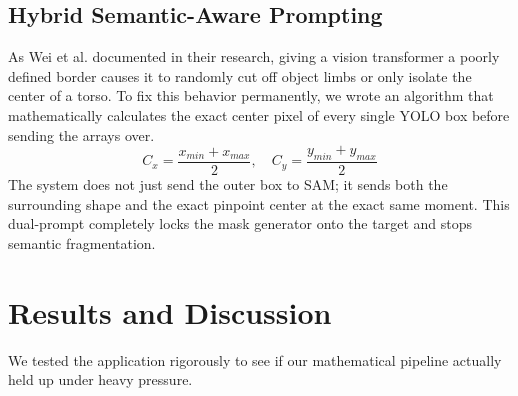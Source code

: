 \documentclass[10pt, conference]{IEEEtran}
\begin{document}
\vspace{0.3cm}
\noindent{}
\vspace{0.3cm}

\subsection{Hybrid Semantic-Aware Prompting}
As Wei et al. \cite{b3} documented in their research, giving a vision transformer a poorly defined border causes it to randomly cut off object limbs or only isolate the center of a torso. To fix this behavior permanently, we wrote an algorithm that mathematically calculates the exact center pixel of every single YOLO box before sending the arrays over. 
\begin{equation}
C_x = \frac{x_{min} + x_{max}}{2}, \quad C_y = \frac{y_{min} + y_{max}}{2}
\end{equation}
The system does not just send the outer box to SAM; it sends both the surrounding shape and the exact pinpoint center at the exact same moment. This dual-prompt completely locks the mask generator onto the target and stops semantic fragmentation.

\section{Results and Discussion}
We tested the application rigorously to see if our mathematical pipeline actually held up under heavy pressure. 
\end{document}

